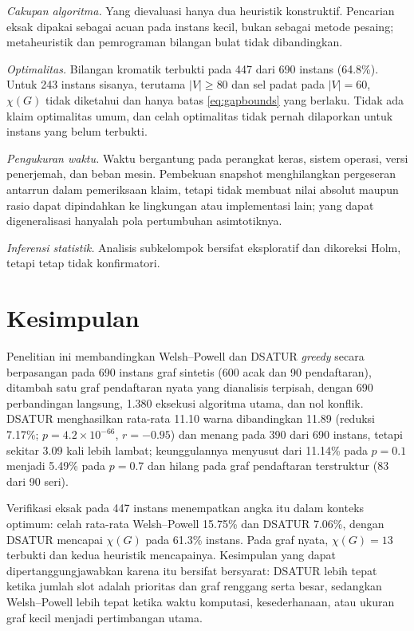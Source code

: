 \documentclass[conference,a4paper]{IEEEtran}
\begin{document}
\emph{Cakupan algoritma.} Yang dievaluasi hanya dua heuristik konstruktif.
Pencarian eksak dipakai sebagai acuan pada instans kecil, bukan sebagai metode
pesaing; metaheuristik dan pemrograman bilangan bulat tidak dibandingkan.

\emph{Optimalitas.} Bilangan kromatik terbukti pada 447 dari 690 instans
(64.8\%). Untuk 243 instans sisanya, terutama $|V|\ge 80$ dan sel padat pada
$|V|=60$, $\chi(G)$ tidak diketahui dan hanya batas
\eqref{eq:gapbounds} yang berlaku. Tidak ada klaim optimalitas umum, dan celah
optimalitas tidak pernah dilaporkan untuk instans yang belum terbukti.

\emph{Pengukuran waktu.} Waktu bergantung pada perangkat keras, sistem operasi,
versi penerjemah, dan beban mesin. Pembekuan snapshot menghilangkan pergeseran
antarrun dalam pemeriksaan klaim, tetapi tidak membuat nilai absolut maupun
rasio dapat dipindahkan ke lingkungan atau implementasi lain; yang dapat
digeneralisasi hanyalah pola pertumbuhan asimtotiknya.

\emph{Inferensi statistik.} Analisis subkelompok bersifat eksploratif dan
dikoreksi Holm, tetapi tetap tidak konfirmatori.

\section{Kesimpulan}
\label{sec:concl}

Penelitian ini membandingkan Welsh--Powell dan DSATUR \emph{greedy} secara
berpasangan pada 690 instans graf sintetis (600 acak dan 90 pendaftaran),
ditambah satu graf pendaftaran nyata yang dianalisis terpisah, dengan 690
perbandingan langsung, 1.380 eksekusi algoritma utama, dan nol konflik.
DSATUR menghasilkan rata-rata 11.10 warna dibandingkan 11.89 (reduksi 7.17\%;
$p=4.2\times10^{-66}$, $r=-0.95$) dan menang pada 390 dari 690 instans, tetapi
sekitar 3.09 kali lebih lambat; keunggulannya menyusut dari 11.14\% pada
$p=0.1$ menjadi 5.49\% pada $p=0.7$ dan hilang pada graf pendaftaran
terstruktur (83 dari 90 seri).

Verifikasi eksak pada 447 instans menempatkan angka itu dalam konteks optimum:
celah rata-rata Welsh--Powell 15.75\% dan DSATUR 7.06\%, dengan DSATUR mencapai
$\chi(G)$ pada 61.3\% instans. Pada graf nyata, $\chi(G)=13$ terbukti dan kedua
heuristik mencapainya. Kesimpulan yang dapat dipertanggungjawabkan karena itu
bersifat bersyarat: DSATUR lebih tepat ketika jumlah slot adalah prioritas dan
graf renggang serta besar, sedangkan Welsh--Powell lebih tepat ketika waktu
komputasi, kesederhanaan, atau ukuran graf kecil menjadi pertimbangan utama.



\end{document}
